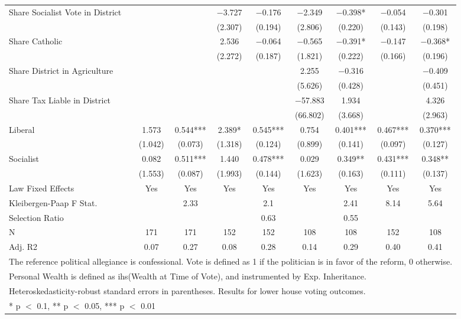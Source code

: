 \begin{table}[!h]
{\begin{tabular}[t]{lcccccccc}
Share Socialist Vote in District &  &  & \num{-3.727} & \num{-0.176} & \num{-2.349} & \num{-0.398}* & \num{-0.054} & \num{-0.301}\\
 &  &  & (\num{2.307}) & (\num{0.194}) & (\num{2.806}) & (\num{0.220}) & (\num{0.143}) & (\num{0.198})\\
Share Catholic &  &  & \num{2.536} & \num{-0.064} & \num{-0.565} & \num{-0.391}* & \num{-0.147} & \num{-0.368}*\\
 &  &  & (\num{2.272}) & (\num{0.187}) & (\num{1.821}) & (\num{0.222}) & (\num{0.166}) & (\num{0.196})\\
Share District in Agriculture &  &  &  &  & \num{2.255} & \num{-0.316} &  & \num{-0.409}\\
 &  &  &  &  & (\num{5.626}) & (\num{0.428}) &  & (\num{0.451})\\
Share Tax Liable in District &  &  &  &  & \num{-57.883} & \num{1.934} &  & \num{4.326}\\
 &  &  &  &  & (\num{66.802}) & (\num{3.668}) &  & (\num{2.963})\\
Liberal & \num{1.573} & \num{0.544}*** & \num{2.389}* & \num{0.545}*** & \num{0.754} & \num{0.401}*** & \num{0.467}*** & \num{0.370}***\\
 & (\num{1.042}) & (\num{0.073}) & (\num{1.318}) & (\num{0.124}) & (\num{0.899}) & (\num{0.141}) & (\num{0.097}) & (\num{0.127})\\
Socialist & \num{0.082} & \num{0.511}*** & \num{1.440} & \num{0.478}*** & \num{0.029} & \num{0.349}** & \num{0.431}*** & \num{0.348}**\\
 & (\num{1.553}) & (\num{0.087}) & (\num{1.993}) & (\num{0.144}) & (\num{1.623}) & (\num{0.163}) & (\num{0.111}) & (\num{0.137})\\
\midrule
Law Fixed Effects & Yes & Yes & Yes & Yes & Yes & Yes & Yes & Yes\\
Kleibergen-Paap F Stat. &  & 2.33 &  & 2.1 &  & 2.41 & 8.14 & 5.64\\
Selection Ratio &  &  &  & 0.63 &  & 0.55 &  & \\
N & \num{171} & \num{171} & \num{152} & \num{152} & \num{108} & \num{108} & \num{152} & \num{108}\\
Adj. R2 & \num{0.07} & \num{0.27} & \num{0.08} & \num{0.28} & \num{0.14} & \num{0.29} & \num{0.40} & \num{0.41}\\
\bottomrule
\multicolumn{9}{l}{\rule{0pt}{1em}The reference political allegiance is confessional. Vote is defined as 1 if the politician is in favor of the reform, 0 otherwise.}\\
\multicolumn{9}{l}{\rule{0pt}{1em}Personal Wealth is defined as ihs(Wealth at Time of Vote), and instrumented by Exp. Inheritance.}\\
\multicolumn{9}{l}{\rule{0pt}{1em}Heteroskedasticity-robust standard errors in parentheses. Results for lower house voting outcomes.}\\
\multicolumn{9}{l}{\rule{0pt}{1em}* p $<$ 0.1, ** p $<$ 0.05, *** p $<$ 0.01}\\
\end{tabular}}
\end{table}
